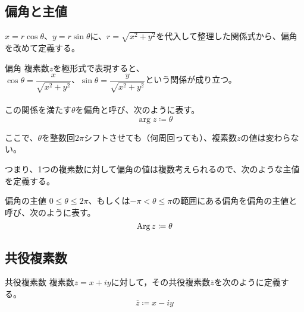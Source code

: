 \documentclass[../math-imaging]{subfiles}
\begin{document}
\subsection{偏角と主値}

$x=r\cos\theta$、$y=r\sin\theta$に、$r=\sqrt{x^2 + y^2}$を代入して整理した関係式から、偏角を改めて定義する。

\begin{definition}{偏角}
  \newline
  複素数$z$を極形式で表現すると、\\
  $\cos\theta=\dfrac{x}{\sqrt{x^2 + y^2}}$、$\sin\theta=\dfrac{y}{\sqrt{x^2 + y^2}}$という関係が成り立つ。\\\\
  この関係を満たす$\theta$を偏角と呼び、次のように表す。
  \LARGE
  \begin{equation}
    \arg z \coloneqq \theta
  \end{equation}
\end{definition}

ここで、$\theta$を整数回$2\pi$シフトさせても（何周回っても）、複素数$z$の値は変わらない。

つまり、1つの複素数に対して偏角の値は複数考えられるので、次のような主値を定義する。

\begin{definition}{偏角の主値}
  \newline
  $0\leq \theta \leq 2\pi$、もしくは$-\pi < \theta \leq \pi$の範囲にある偏角を偏角の主値と呼び、次のように表す。
  \LARGE
  \begin{equation}
    \operatorname{Arg} z \coloneqq \theta
  \end{equation}
\end{definition}

\subsection{共役複素数}

\begin{definition}{共役複素数}
  \newline
  複素数$z=x+iy$に対して，その共役複素数$\overline{z}$を次のように定義する。
  \LARGE
  \begin{equation}
    \overline{z}\coloneqq x-iy
  \end{equation}
\end{definition}
\end{document}
